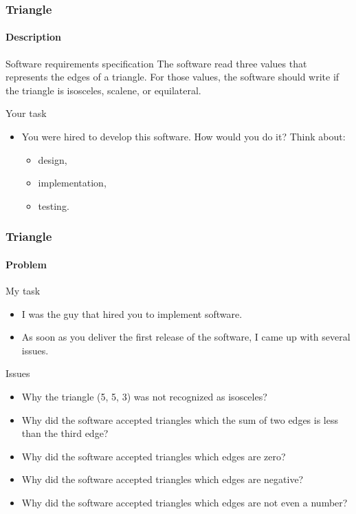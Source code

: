 \begin{frame}[hasprev=false, hasnext=true]
\label{example:triangle}
\frametitle{Triangle}
\framesubtitle{Description}

\begin{block}{Software requirements specification}
The software read three  values that represents the edges of a triangle.
For those values, the software should write if the triangle is isosceles,
scalene, or equilateral.
\end{block}

\begin{block}{Your task}
\begin{itemize}
	\item You were hired to develop this software. How would you do it? Think
	about:
	\begin{itemize}
		\item design,
		\item implementation,
		\item testing.
	\end{itemize}
\end{itemize}
\end{block}
\end{frame}



\begin{frame}[hasprev=true, hasnext=true]
\frametitle{Triangle}
\framesubtitle{Problem}

\begin{block}{My task}
\begin{itemize}
	\item I was the guy that hired you to implement software.

	\item As soon as you deliver the first release of the software, I came up
	with several issues.
\end{itemize}
\end{block}

\begin{block:fact}{Issues}
\begin{itemize}
	\item Why the triangle (5, 5, 3) was not recognized as isosceles?

	\item Why did the software accepted triangles which the sum of two edges
	is less than the third edge?

	\item Why did the software accepted triangles which edges are zero?

	\item Why did the software accepted triangles which edges are negative?

	\item Why did the software accepted triangles which edges are not even a
	number?
\end{itemize}
\end{block:fact}
\end{frame}


